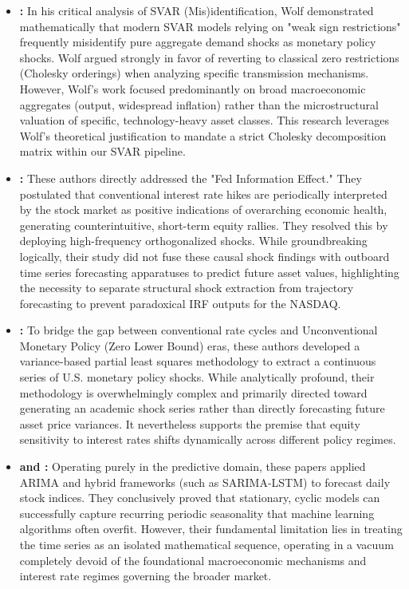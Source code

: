 \documentclass[12pt,a4paper]{report}
\begin{document}
\begin{itemize}
    \item \textbf{\citet{wolf2020}:} In his critical analysis of SVAR (Mis)identification, Wolf demonstrated mathematically that modern SVAR models relying on "weak sign restrictions" frequently misidentify pure aggregate demand shocks as monetary policy shocks. Wolf argued strongly in favor of reverting to classical zero restrictions (Cholesky orderings) when analyzing specific transmission mechanisms. However, Wolf's work focused predominantly on broad macroeconomic aggregates (output, widespread inflation) rather than the microstructural valuation of specific, technology-heavy asset classes. This research leverages Wolf's theoretical justification to mandate a strict Cholesky decomposition matrix within our SVAR pipeline.
    \item \textbf{\citet{bauer2023alternative,bauer2022reassessment}:} These authors directly addressed the "Fed Information Effect." They postulated that conventional interest rate hikes are periodically interpreted by the stock market as positive indications of overarching economic health, generating counterintuitive, short-term equity rallies. They resolved this by deploying high-frequency orthogonalized shocks. While groundbreaking logically, their study did not fuse these causal shock findings with outboard time series forecasting apparatuses to predict future asset values, highlighting the necessity to separate structural shock extraction from trajectory forecasting to prevent paradoxical IRF outputs for the NASDAQ.
    \item \textbf{\citet{bu2019unified}:} To bridge the gap between conventional rate cycles and Unconventional Monetary Policy (Zero Lower Bound) eras, these authors developed a variance-based partial least squares methodology to extract a continuous series of U.S. monetary policy shocks. While analytically profound, their methodology is overwhelmingly complex and primarily directed toward generating an academic shock series rather than directly forecasting future asset price variances. It nevertheless supports the premise that equity sensitivity to interest rates shifts dynamically across different policy regimes.
    \item \textbf{\citet{alshiab2006predictability} and \citet{jisha2023hybridizing}:} Operating purely in the predictive domain, these papers applied ARIMA and hybrid frameworks (such as SARIMA-LSTM) to forecast daily stock indices. They conclusively proved that stationary, cyclic models can successfully capture recurring periodic seasonality that machine learning algorithms often overfit. However, their fundamental limitation lies in treating the time series as an isolated mathematical sequence, operating in a vacuum completely devoid of the foundational macroeconomic mechanisms and interest rate regimes governing the broader market.
\end{itemize}
\end{document}
